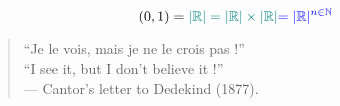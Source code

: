 \begin{frame}{}
  \begin{theorem}[$|\R|$ (1877)]
    \[
      (0,1) = \textcolor{teal}{|\mathbb{R}| = |\mathbb{R}| \times |\mathbb{R}|} \textcolor{blue}{= |\mathbb{R}|^{n \in \mathbb{N}}}
    \]
  \end{theorem}

  \pause
  \vspace{0.80cm}
  \begin{quote}
    \begin{center}
      ``Je le vois, mais je ne le crois pas !'' \\[8pt]
      ``I see it, but I don't believe it !'' \\[10pt]
      \hfill --- Cantor's letter to Dedekind (1877). 
    \end{center}
  \end{quote}

  \pause
  \vspace{0.60cm}
  \centerline{}
\end{frame}
